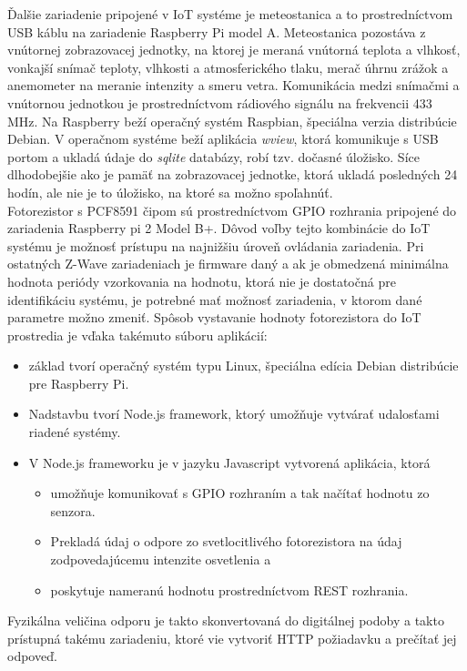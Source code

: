 \indent Ďalšie zariadenie pripojené v IoT systéme je meteostanica a to prostredníctvom USB káblu na zariadenie Raspberry Pi model A. Meteostanica pozostáva z vnútornej zobrazovacej jednotky, na ktorej je meraná vnútorná teplota a vlhkosť, vonkajší snímač teploty, vlhkosti a atmosferického tlaku,  merač úhrnu zrážok a anemometer na meranie intenzity a smeru vetra. Komunikácia medzi snímačmi a vnútornou jednotkou je prostredníctvom rádiového signálu na frekvencii 433 MHz. Na Raspberry beží operačný systém Raspbian, špeciálna verzia distribúcie Debian. V operačnom systéme beží aplikácia \textit{wview}, ktorá komunikuje s USB portom a ukladá údaje do \textit{sqlite} databázy, robí tzv. dočasné úložisko. Síce dlhodobejšie ako je pamäť na zobrazovacej jednotke, ktorá ukladá posledných 24 hodín, ale nie je to úložisko, na ktoré sa možno spoľahnúť. \\ 
\indent Fotorezistor s PCF8591 čipom sú prostredníctvom GPIO rozhrania pripojené do zariadenia Raspberry pi 2 Model B+. Dôvod voľby tejto kombinácie do IoT systému je možnosť prístupu na najnižšiu úroveň ovládania zariadenia. Pri ostatných Z-Wave zariadeniach je firmware daný a ak je obmedzená minimálna hodnota periódy vzorkovania na hodnotu, ktorá nie je dostatočná pre identifikáciu systému, je potrebné mať možnosť zariadenia, v ktorom dané parametre možno zmeniť. Spôsob vystavanie hodnoty fotorezistora do IoT prostredia je vďaka takémuto súboru aplikácií:
\begin{itemize}
\item základ tvorí operačný systém typu Linux, špeciálna edícia Debian distribúcie pre Raspberry Pi.
\item Nadstavbu tvorí Node.js framework, ktorý umožňuje vytvárať udalosťami riadené  systémy.
\item V Node.js frameworku je v jazyku Javascript vytvorená aplikácia, ktorá 
  \begin{itemize}
  \item umožňuje komunikovať s GPIO rozhraním a tak načítať hodnotu zo senzora.
  \item Prekladá údaj o odpore zo svetlocitlivého fotorezistora na údaj zodpovedajúcemu intenzite osvetlenia a
  \item poskytuje nameranú hodnotu prostredníctvom REST rozhrania.
  \end{itemize}
\end{itemize} 
Fyzikálna veličina odporu je takto skonvertovaná do digitálnej podoby a takto prístupná takému zariadeniu, ktoré vie vytvoriť HTTP požiadavku a prečítať jej odpoveď.
 
